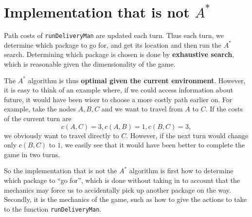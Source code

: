 \section{Implementation that is not $A^*$}

Path costs of \texttt{runDeliveryMan} are updated each turn. Thus each turn, we determine which package to go for, and get its location and then run the $A^*$ search. Determining which package is chosen is done by \textbf{exhaustive search}, which is reasonable given the dimensionality of the game.

The $A^*$ algorithm is thus \textbf{optimal given the current environment}. However, it is easy to think of an example where, if we could access information about future, it would have been wiser to choose a more costly path earlier on. For example, take the nodes $A, B, C$ and we want to travel from $A$ to $C$. If the costs of the current turn are
$$c(A, C) = 3, c(A, B) = 1, c(B, C) = 3,$$
we obviously want to travel directly to $C$. However, if the next turn would change only $c(B, C)$ to $1$, we easily see that it would have been better to complete the game in two turns.

So the implementation that is not the $A^*$ algorithm is first how to determine which package to ``go for'', which is done without taking in to account that the mechanics may force us to accidentally pick up another package on the way. Secondly, it is the mechanics of the game, such as how to give the actions to take to the function \texttt{runDeliveryMan}.
